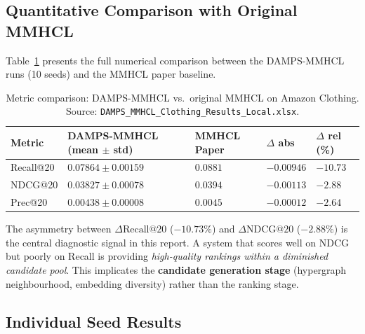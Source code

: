 \documentclass[12pt,a4paper]{article}
\begin{document}
\subsection{Quantitative Comparison with Original MMHCL}

Table~\ref{tab:metric_comparison} presents the full numerical comparison
between the DAMPS-MMHCL runs (10 seeds) and the MMHCL paper baseline.

\begin{table}[htbp]
\centering
\caption{Metric comparison: DAMPS-MMHCL vs.\ original MMHCL on Amazon Clothing.
Source: \texttt{DAMPS\_MMHCL\_Clothing\_Results\_Local.xlsx}.}
\label{tab:metric_comparison}
\begin{tabular}{|>{\raggedright\arraybackslash}p{2.3cm}|>{\centering\arraybackslash}p{3.2cm}|>{\centering\arraybackslash}p{2.0cm}|>{\centering\arraybackslash}p{1.8cm}|>{\centering\arraybackslash}p{1.8cm}|}
\hline
\rowcolor{tabhead}\textbf{Metric} & \textbf{DAMPS-MMHCL (mean $\pm$ std)} & \textbf{MMHCL Paper} & \textbf{$\Delta$ abs} & \textbf{$\Delta$ rel (\%)} \\
\hline
Recall@20    & $0.07864 \pm 0.00159$ & $0.0881$ & $-0.00946$ & $-10.73$ \\\hline
NDCG@20      & $0.03827 \pm 0.00078$ & $0.0394$ & $-0.00113$ & $-2.88$  \\\hline
Prec@20      & $0.00438 \pm 0.00008$ & $0.0045$ & $-0.00012$ & $-2.64$  \\\hline
\end{tabular}
\end{table}

The asymmetry between $\Delta\text{Recall@20}$ ($-10.73\%$) and
$\Delta\text{NDCG@20}$ ($-2.88\%$) is the central diagnostic signal in
this report.  A system that scores well on NDCG but poorly on Recall is
providing \emph{high-quality rankings within a diminished candidate pool}.
This implicates the \textbf{candidate generation stage} (hypergraph
neighbourhood, embedding diversity) rather than the ranking stage.

\subsection{Individual Seed Results}
\end{document}
